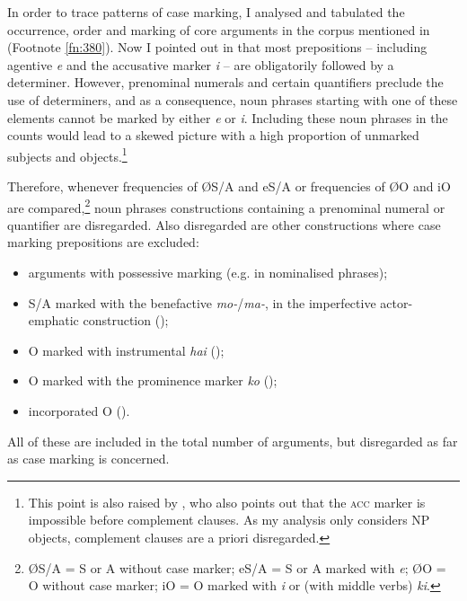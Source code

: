 In order to trace patterns of case marking, I analysed and tabulated the occurrence, order and marking of core arguments in the corpus mentioned in  (Footnote \ref{fn:380}). Now I pointed out in  that most prepositions – including agentive \textit{e} and the accusative marker \textit{i} – are obligatorily followed by a determiner. However, prenominal numerals and certain quantifiers preclude the use of determiners, and as a consequence, noun phrases starting with one of these elements cannot be marked by either \textit{e} or \textit{i}. Including these noun phrases in the counts would lead to a skewed picture with a high proportion of unmarked subjects and objects.\footnote{\label{fn:388}This point is also raised by \citet[43]{WeberN2003}, who also points out that the \textsc{acc} marker is impossible before complement clauses. As my analysis only considers NP objects, complement clauses are a priori disregarded.}

Therefore, whenever frequencies of ØS/A and eS/A or frequencies of ØO and iO are compared,\footnote{\label{fn:389}ØS/A = S or A without case marker; eS/A = S or A marked with \textit{e}; ØO = O without case marker; iO = O marked with \textit{i} or (with middle verbs) \textit{ki}.} noun phrases constructions containing a prenominal numeral or quantifier are disregarded. Also disregarded are other constructions where case marking prepositions are excluded:

\begin{itemize}
\item 
arguments with possessive marking (e.g. in nominalised phrases);

\item 
S/A marked with the benefactive \textit{mo-}/\textit{ma-}, in the imperfective actor-emphatic construction ();

\item 
O marked with instrumental \textit{hai} ();

\item 
O marked with the prominence marker \textit{ko} ();

\item 
incorporated O ().

\end{itemize}

All of these are included in the total number of arguments, but disregarded as far as case marking is concerned.
